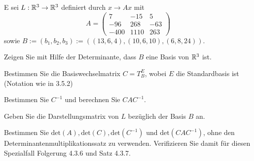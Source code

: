 \begin{Problem}
	E sei $L:\mathbb{R}^3\to \mathbb{R}^3$ definiert durch $x\to Ax$ mit
	\[
		A=\begin{pmatrix} 7 & -15 & 5 \\ -96 & 268 & -63 \\ -400 & 1110 & 263 \end{pmatrix} 
\]
sowie $B:=(b_1,b_2,b_3):=((13,6,4),(10,6,10),(6,8,24))$. 
\begin{parts}
\item Zeigen Sie mit Hilfe der Determinante, dass $B$ eine Basis von $\mathbb{R}^3$ ist.
\item Bestimmen Sie die Basiswechselmatrix $C=T_B^E$, wobei $E$ die Standardbasis ist (Notation wie in 3.5.2)
\item Bestimmen Sie $C^{-1}$ und berechnen Sie $CAC^{-1}$.
\item Geben Sie die Darstellungsmatrix von $L$ bezüglich der Basis $B$ an.
\item Bestimmen Sie $\text{det}(A),\text{det}(C),\text{det}(C^{-1})$ und $\text{det}(CAC^{-1})$, ohne den Determinantenmultiplikationssatz zu verwenden. Verifizieren Sie damit für diesen Spezialfall Folgerung 4.3.6 und Satz 4.3.7. 
\end{parts}
\end{Problem}

